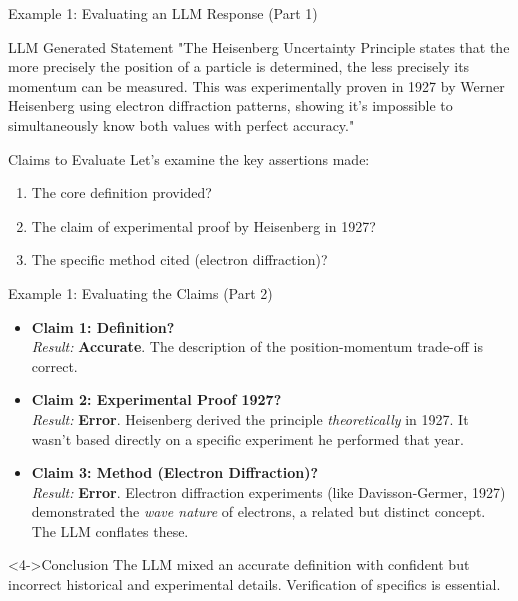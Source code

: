 \documentclass{beamer}
\begin{document}
\begin{frame}{Example 1: Evaluating an LLM Response (Part 1)}

\begin{block}{LLM Generated Statement}
"The Heisenberg Uncertainty Principle states that the more precisely the position of a particle is determined, the less precisely its momentum can be measured. This was experimentally proven in 1927 by Werner Heisenberg using electron diffraction patterns, showing it's impossible to simultaneously know both values with perfect accuracy."
\end{block}

\pause  %

\begin{block}{Claims to Evaluate}
Let's examine the key assertions made:
\begin{enumerate}
  \item The core definition provided?
  \item The claim of experimental proof by Heisenberg in 1927?
  \item The specific method cited (electron diffraction)?
\end{enumerate}
\end{block}

\end{frame}

\begin{frame}{Example 1: Evaluating the Claims (Part 2)}

\begin{itemize}
    \item<1-> \textbf{Claim 1: Definition?} \\
        \textit{Result:} \textbf{Accurate}. The description of the position-momentum trade-off is correct.
    \pause  %

    \item<2-> \textbf{Claim 2: Experimental Proof 1927?} \\
        \textit{Result:} \textbf{Error}. Heisenberg derived the principle \emph{theoretically} in 1927. It wasn't based directly on a specific experiment he performed that year.
    \pause  %

    \item<3-> \textbf{Claim 3: Method (Electron Diffraction)?} \\
        \textit{Result:} \textbf{Error}. Electron diffraction experiments (like Davisson-Germer, 1927) demonstrated the \emph{wave nature} of electrons, a related but distinct concept. The LLM conflates these.
    \pause  %
\end{itemize}

\begin{alertblock}<4->{Conclusion}
The LLM mixed an accurate definition with confident but incorrect historical and experimental details. Verification of specifics is essential.
\end{alertblock}

\end{frame}
\end{document}
